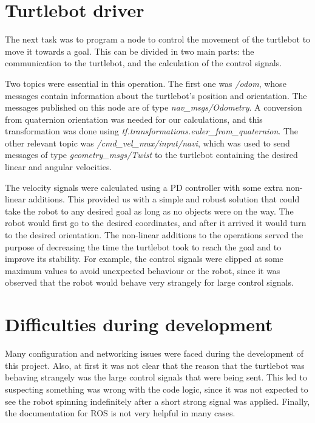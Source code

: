 \documentclass[11pt,oneside,a4paper]{article}
\begin{document}
\section{Turtlebot driver}

The next task was to program a node to control the movement of the turtlebot to move it towards a goal. This can be divided in two main parts: the communication to the turtlebot, and the calculation of the control signals.

Two topics were essential in this operation. The first one was \textit{/odom}, whose messages contain information about the turtlebot's position and orientation. The messages published on this node are of type \textit{nav\_msgs/Odometry}. A conversion from quaternion orientation was needed for our calculations, and this transformation was done using \textit{tf.transformations.euler\_from\_quaternion}. The other relevant topic was \textit{/cmd\_vel\_mux/input/navi}, which was used to send messages of type \textit{geometry\_msgs/Twist} to the turtlebot containing the desired linear and angular velocities.

The velocity signals were calculated using a PD controller with some extra non-linear additions. This provided us with a simple and robust solution that could take the robot to any desired goal as long as no objects were on the way. The robot would first go to the desired coordinates, and after it arrived it would turn to the desired orientation. The non-linear additions to the operations served the purpose of decreasing the time the turtlebot took to reach the goal and to improve its stability. For example, the control signals were clipped at some maximum values to avoid unexpected behaviour or the robot, since it was observed that the robot would behave very strangely for large control signals.

\section{Difficulties during development}

Many configuration and networking issues were faced during the development of this project. Also, at first it was not clear that the reason that the turtlebot was behaving strangely was the large control signals that were being sent. This led to suspecting something was wrong with the code logic, since it was not expected to see the robot spinning indefinitely after a short strong signal was applied. Finally, the documentation for ROS is not very helpful in many cases.
\end{document}
